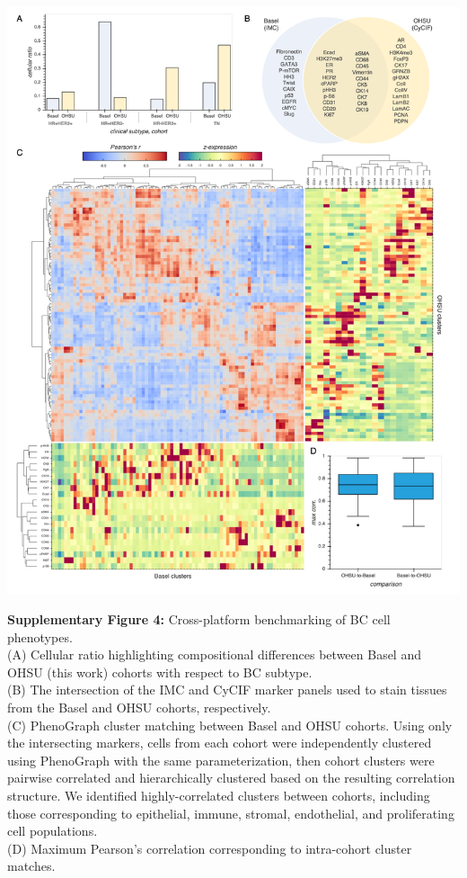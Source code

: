 \documentclass[preprint,review,3p,12pt]{elsarticle}
\begin{document}
\begin{suppfigure}[p]
\centering\includegraphics[width=\linewidth,
                 keepaspectratio]{suppfig4}
\caption{}
\label{fig:suppfig4}
\end{suppfigure}

\newpage

\noindent
\textbf{Supplementary Figure 4:} Cross-platform benchmarking of BC cell phenotypes.\\
(A) Cellular ratio highlighting compositional differences between Basel \cite{jackson_single-cell_2020} and OHSU (this work) cohorts with respect to BC subtype.\\
(B) The intersection of the IMC and CyCIF marker panels used to stain tissues from the Basel and OHSU cohorts, respectively.\\
(C) PhenoGraph cluster matching between Basel and OHSU cohorts. Using only the intersecting markers, cells from each cohort were independently clustered using PhenoGraph with the same parameterization, then cohort clusters were pairwise correlated and hierarchically clustered based on the resulting correlation structure. We identified highly-correlated clusters between cohorts, including those corresponding to epithelial, immune, stromal, endothelial, and proliferating cell populations.\\
(D) Maximum Pearson's correlation corresponding to intra-cohort cluster matches.
\end{document}
